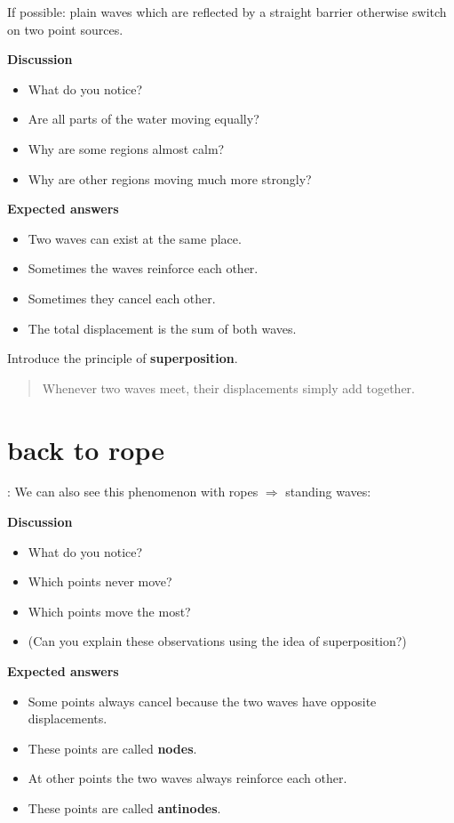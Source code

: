 \documentclass[a4paper,11pt]{article}
\begin{document}
If possible: plain waves which are reflected by a straight barrier otherwise switch on two point sources. 

\textbf{Discussion}
\begin{itemize}
    \item What do you notice?
    \item Are all parts of the water moving equally?
    \item Why are some regions almost calm?
    \item Why are other regions moving much more strongly?
\end{itemize}

\textbf{Expected answers}
\begin{itemize}
    \item Two waves can exist at the same place.
    \item Sometimes the waves reinforce each other.
    \item Sometimes they cancel each other.
    \item The total displacement is the sum of both waves.
\end{itemize}

Introduce the principle of \textbf{superposition}.

\begin{quote}
Whenever two waves meet, their displacements simply add together.
\end{quote}

\section{back to rope}: 
We can also see this phenomenon with ropes $\Rightarrow$ standing waves: 

\textbf{Discussion}

\begin{itemize}
    \item What do you notice?
    \item Which points never move?
    \item Which points move the most?
    \item (Can you explain these observations using the idea of superposition?)
\end{itemize}

\textbf{Expected answers}

\begin{itemize}
    \item Some points always cancel because the two waves have opposite displacements.
    \item These points are called \textbf{nodes}.
    \item At other points the two waves always reinforce each other.
    \item These points are called \textbf{antinodes}.
\end{itemize}
\end{document}
